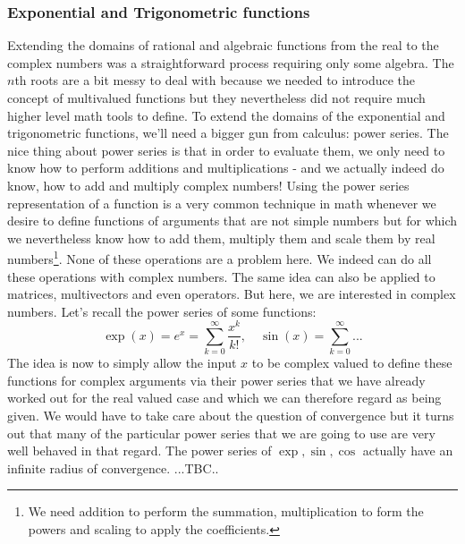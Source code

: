 

\subsubsection{Exponential and Trigonometric functions}
Extending the domains of rational and algebraic functions from the real to the complex numbers was a straightforward process requiring only some algebra. The $n$th roots are a bit messy to deal with because we needed to introduce the concept of multivalued functions but they nevertheless did not require much higher level math tools to define. To extend the domains of the exponential and trigonometric functions, we'll need a bigger gun from calculus: power series. The nice thing about power series is that in order to evaluate them, we only need to know how to perform additions and multiplications - and we actually indeed do know, how to add and multiply complex numbers! Using the power series representation of a function is a very common technique in math whenever we desire to define functions of arguments that are not simple numbers but for which we nevertheless know how to add them, multiply them and scale them by real numbers\footnote{We need addition to perform the summation, multiplication to form the powers and scaling to apply the coefficients.}. None of these operations are a problem here. We indeed can do all these operations with complex numbers. The same idea can also be applied to matrices, multivectors and even operators. But here, we are interested in complex numbers. Let's recall the power series of some functions:
\begin{equation}
 \exp(x) = e^x = \sum_{k=0}^{\infty} \frac{x^k}{k!}, \quad
 \sin(x) =  \sum_{k=0}^{\infty} ...
\end{equation}
The idea is now to simply allow the input $x$ to be complex valued to define these functions for complex arguments via their power series that we have already worked out for the real valued case and which we can therefore regard as being given. We would have to take care about the question of convergence but it turns out that many of the particular power series that we are going to use are very well behaved in that regard. The power series of $\exp, \sin, \cos$ actually have an infinite radius of convergence. ...TBC..
